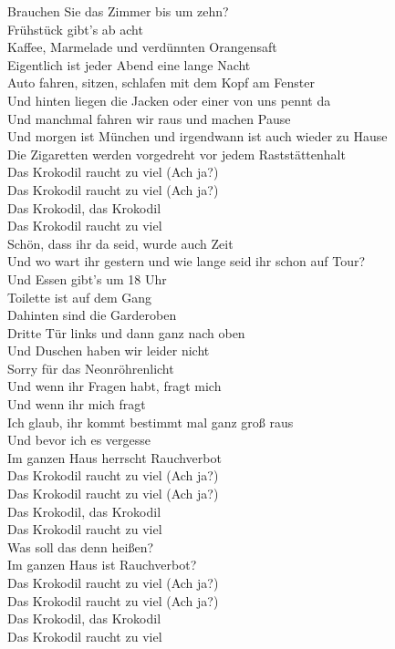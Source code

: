 \documentclass[]{book}
\begin{document}
Brauchen Sie das Zimmer bis um zehn?\\
Frühstück gibt's ab acht\\
Kaffee, Marmelade und verdünnten Orangensaft\\
Eigentlich ist jeder Abend eine lange Nacht\\
Auto fahren, sitzen, schlafen mit dem Kopf am Fenster\\
Und hinten liegen die Jacken oder einer von uns pennt da\\
Und manchmal fahren wir raus und machen Pause\\
Und morgen ist München und irgendwann ist auch wieder zu Hause\\
Die Zigaretten werden vorgedreht vor jedem Raststättenhalt\\
Das Krokodil raucht zu viel (Ach ja?)\\
Das Krokodil raucht zu viel (Ach ja?)\\
Das Krokodil, das Krokodil\\
Das Krokodil raucht zu viel\\
Schön, dass ihr da seid, wurde auch Zeit\\
Und wo wart ihr gestern und wie lange seid ihr schon auf Tour?\\
Und Essen gibt's um 18 Uhr\\
Toilette ist auf dem Gang\\
Dahinten sind die Garderoben\\
Dritte Tür links und dann ganz nach oben\\
Und Duschen haben wir leider nicht\\
Sorry für das Neonröhrenlicht\\
Und wenn ihr Fragen habt, fragt mich\\
Und wenn ihr mich fragt\\
Ich glaub, ihr kommt bestimmt mal ganz groß raus\\
Und bevor ich es vergesse\\
Im ganzen Haus herrscht Rauchverbot\\
Das Krokodil raucht zu viel (Ach ja?)\\
Das Krokodil raucht zu viel (Ach ja?)\\
Das Krokodil, das Krokodil\\
Das Krokodil raucht zu viel\\
Was soll das denn heißen?\\
Im ganzen Haus ist Rauchverbot?\\
Das Krokodil raucht zu viel (Ach ja?)\\
Das Krokodil raucht zu viel (Ach ja?)\\
Das Krokodil, das Krokodil\\
Das Krokodil raucht zu viel
\end{document}
